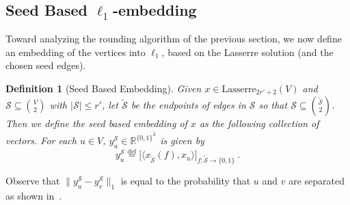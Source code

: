 \documentclass{article}
\def\triangleq{\overset{\mathrm{def}}{=}}
\newtheorem{definition}{Definition}[section]
\newcommand{\R}{\mathbb{R}}
\newcommand{\lasserreii}[2]{\mathrm{Lasserre}_{#1}(#2)}
\newcommand{\xvec}{\vec{x}} \newcommand{\yvec}{\vec{y}} \newcommand{\xmat}{\vec{X}} \newcommand{\ymat}{\vec{Y}} \newcommand{\zmat}{\vec{Z}}
\newcounter{alg-count}
\def\vec{}
\newcommand{\sde}{{\mathcal{S}}}
\newcommand{\sdn}{{\widetilde{\mathcal{S}}}}
\begin{document}
\subsection{Seed Based $\ell_1$-embedding}
Toward analyzing the rounding algorithm of the previous section, we
now define an embedding of the vertices into $\ell_1$, based on the
Lasserre solution (and the chosen seed edges).
\begin{definition}[Seed Based Embedding]
  \label{def:our-embedding}
  Given $\xvec \in \lasserreii{2 r'+2}{V}$ and $\sde \subseteq
  \binom{V}{2}$ with $|\sde|\le r'$, let $\sdn$ be the endpoints of
  edges in $\sde$ so that $\sde \subseteq \binom{\sdn}{2}$. Then we
  define the seed based embedding of $\xvec$ as the following
  collection of vectors.
For each $u\in V$, $\yvec^\sde_u \in \R^{\{0,1\}^{\sdn}}$ is given
  by
  \[ \yvec^\sde_u \triangleq \bigg[ \langle \xvec_{\sdn}(f),
  \xvec_u\rangle \bigg]_{f:\sdn\to\{0,1\}} \ . \]
\end{definition}
Observe that $\|\yvec^\sde_u - \yvec^\sde_v\|_1$ is equal to the
probability that $u$ and $v$ are separated as shown
in~.
\end{document}
